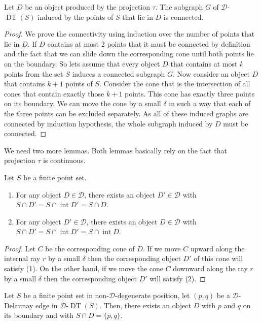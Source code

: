 \documentclass{stacs_proc}
\newcommand{\D}{\mathcal{D}}
\DeclareMathOperator{\intr}{int}
\DeclareMathOperator{\DT}{DT}
\begin{document}
\begin{lemma}
  \label{lem:connect}
  Let $D$ be an object produced by the projection $\tau$. The subgraph
  $G$ of $\D$-$\DT(S)$ induced by the points of $S$ that lie in $D$ is
  connected. 
\end{lemma}

\begin{proof}
  We prove the connectivity using induction over the number of points
  that lie in $D$. 
  If $D$ contains at most 2 points that it must be connected by
  definition and the fact that we can slide down the corresponding
  cone until both points lie on the boundary. So lets assume that
  every object $D$ that contains at most $k$ points from the set $S$
  induces a connected subgraph $G$. Now consider an object $D$ that
  contains $k+1$ points of $S$. Consider the cone that is the
  intersection of all cones that contain  exactly those $k+1$
  points. This cone has exactly three points on its boundary. We can
  move the cone by a small $\delta$ in such a way that each of the three
  points can be excluded separately. As all of these induced graphs
  are connected by induction hypothesis, the whole subgraph induced by
  $D$ must be connected.    
\end{proof}

We need two more lemmas. Both lemmas basically rely on the fact that
projection $\tau$ is continuous. 
\begin{lemma}
  \label{lem:cont}
  Let $S$ be a finite point set.
  \begin{enumerate}
  \item For any object $D\in \D$, there exists an object $D'\in \D$ with
    $S\cap D' = S\cap \intr D' = S\cap D$.
  \item For any object $D'\in \D$, there exists an object $D\in \D$ with
    $S\cap D' = S\cap \intr D' = S\cap \intr D$.   
  \end{enumerate}
\end{lemma}

\begin{proof}
  Let $C$ be the corresponding cone of $D$. If we move $C$ upward
  along the internal ray $r$ by a small $\delta$ then the corresponding
  object $D'$ of this cone will satisfy (1). On the other hand, if we
  move the cone $C$ downward along the ray $r$ by a small $\delta$ then the
  corresponding object $D'$ will satisfy (2).  
\end{proof}


\begin{lemma}
  \label{lem:dedge}
  Let $S$ be a finite point set in non-$\D$-degenerate position, let
  $(p, q)$ be a $\D$-Delaunay edge in $\D$-$\DT(S)$. Then, there exists
  an object $D$ with $p$ and $q$ on its boundary and with $S\cap D
  =\{p,q\}$.  
\end{lemma}
\end{document}
